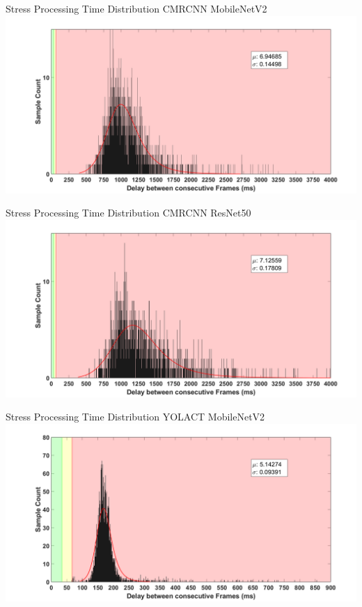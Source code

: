 \documentclass[18pt]{beamer}
\begin{document}
\begin{frame}{Stress Processing Time Distribution CMRCNN MobileNetV2}
\includegraphics[width=\textwidth]{figures/graphs/dist_stress_cmrcnn_mobilenetv2.png}
\end{frame}

\begin{frame}{Stress Processing Time Distribution CMRCNN ResNet50}
\includegraphics[width=\textwidth]{figures/graphs/dist_stress_cmrcnn_resnet50.png}
\end{frame}

\begin{frame}{Stress Processing Time Distribution YOLACT MobileNetV2}
\includegraphics[width=\textwidth]{figures/graphs/dist_stress_yolact_mobilenetv2.png}
\end{frame}
\end{document}
